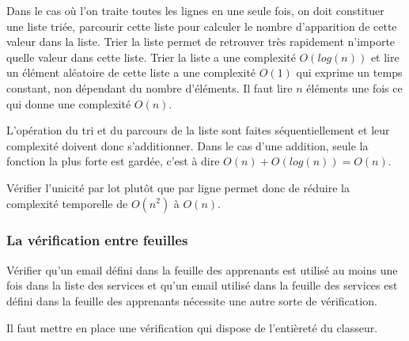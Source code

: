 Dans le cas où l'on traite toutes les lignes en une seule fois, on doit constituer une liste triée, parcourir cette liste pour calculer le nombre d'apparition de cette valeur dans la liste.
Trier la liste permet de retrouver très rapidement n'importe quelle valeur dans cette liste.
Trier la liste a une complexité $O(log(n))$ et lire un élément aléatoire de cette liste a une complexité $O(1)$ qui exprime un temps constant, non dépendant du nombre d'éléments.
Il faut lire $n$ éléments une fois ce qui donne une complexité $O(n)$.

L'opération du tri et du parcours de la liste sont faites séquentiellement et leur complexité doivent donc s'additionner.
Dans le cas d'une addition, seule la fonction la plus forte est gardée, c'est à dire $O(n) + O(log(n)) = O(n)$.

Vérifier l'unicité par lot plutôt que par ligne permet donc de réduire la complexité temporelle de $O(n^2)$ à $O(n)$.

\subsubsection{La vérification entre feuilles}
Vérifier qu'un email défini dans la feuille des apprenants est utilisé au moins une fois dans la liste des services et qu'un email utilisé dans la feuille des services est défini dans la feuille des apprenants nécessite une autre sorte de vérification.

Il faut mettre en place une vérification qui dispose de l'entièreté du classeur.
